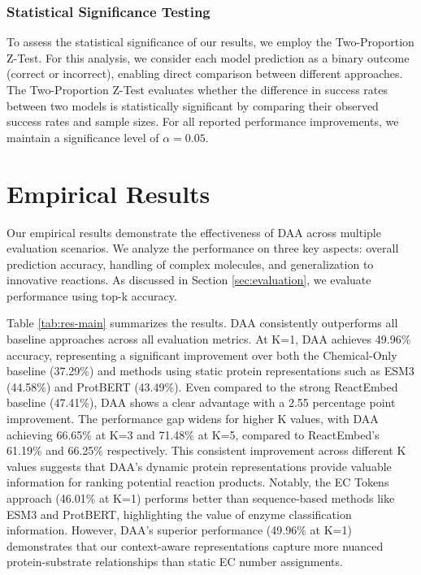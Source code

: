 \documentclass[sigconf]{acmart}
\begin{document}
\subsubsection{Statistical Significance Testing}
To assess the statistical significance of our results, we employ the Two-Proportion Z-Test. For this analysis, we consider each model prediction as a binary outcome (correct or incorrect), enabling direct comparison between different approaches. 
The Two-Proportion Z-Test evaluates whether the difference in success rates between two models is statistically significant by comparing their observed success rates and sample sizes.
For all reported performance improvements, we maintain a significance level of $\alpha = 0.05$.







\section{Empirical Results}
Our empirical results demonstrate the effectiveness of DAA across multiple evaluation scenarios. We analyze the performance on three key aspects: overall prediction accuracy, handling of complex molecules, and generalization to innovative reactions.
As discussed in Section \ref{sec:evaluation}, we evaluate performance using top-k accuracy.


Table \ref{tab:res-main} summarizes the results. DAA consistently outperforms all baseline approaches across all evaluation metrics. At K=1, DAA achieves 49.96\% accuracy, representing a significant improvement over both the Chemical-Only baseline (37.29\%) and methods using static protein representations such as ESM3 (44.58\%) and ProtBERT (43.49\%). Even compared to the strong ReactEmbed baseline (47.41\%), DAA shows a clear advantage with a 2.55 percentage point improvement.
The performance gap widens for higher K values, with DAA achieving 66.65\% at K=3 and 71.48\% at K=5, compared to ReactEmbed's 61.19\% and 66.25\% respectively. This consistent improvement across different K values suggests that DAA's dynamic protein representations provide valuable information for ranking potential reaction products.
Notably, the EC Tokens approach (46.01\% at K=1) performs better than sequence-based methods like ESM3 and ProtBERT, highlighting the value of enzyme classification information. However, DAA's superior performance (49.96\% at K=1) demonstrates that our context-aware representations capture more nuanced protein-substrate relationships than static EC number assignments.
\end{document}
